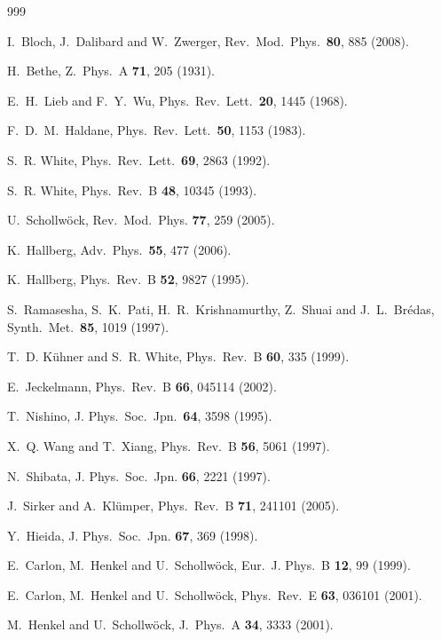 \begin{thebibliography}{999}

I.~Bloch, J.~Dalibard and W.~Zwerger, Rev.\ Mod.\ Phys.\ {\bf 80}, 885 (2008).

H.~Bethe, Z.\ Phys.\ A {\bf 71}, 205 (1931).

E.~H.~Lieb and F.~Y.~Wu, Phys.\ Rev.\ Lett.\ {\bf 20}, 1445 (1968).

F.~D.~M.~Haldane, Phys.\ Rev.\ Lett.\ {\bf 50}, 1153 (1983). 

S.~R. White, Phys.\ Rev.\ Lett.\ {\bf 69}, 2863 (1992). 

S.~R. White, Phys.\ Rev.\ B {\bf 48}, 10345 (1993). 

 U.~Schollw\"{o}ck, Rev.\ Mod.\ Phys. {\bf 77}, 259 (2005).

 K.~Hallberg, Adv.\ Phys.\ {\bf 55}, 477 (2006).

K.~Hallberg, Phys.\ Rev.\ B {\bf 52}, 9827 (1995).

S.~Ramasesha, S.~K.~Pati, H.~R.~Krishnamurthy, Z.~Shuai and J.~L.~Br{\'e}das, Synth.\ Met.\ {\bf 85}, 1019 (1997).

T.~D. K\"{u}hner and S.~R. White, Phys.\ Rev.\ B {\bf 60}, 335 (1999).

E.~Jeckelmann, Phys.\ Rev.\ B {\bf 66}, 045114 (2002).
 
T.~Nishino, J. Phys.\ Soc.\ Jpn.\ {\bf 64}, 3598 (1995).

X.~Q. Wang and T.~Xiang, Phys.\ Rev.\ B {\bf 56}, 5061 (1997).

N.~Shibata, J. Phys.\ Soc.\ Jpn. {\bf 66}, 2221 (1997).

J.~Sirker and A.~Kl\"{u}mper, Phys.\ Rev.\ B {\bf 71}, 241101 (2005).

Y.~Hieida, J. Phys.\ Soc.\ Jpn. {\bf 67}, 369 (1998).

E.~Carlon, M.~Henkel and U.~Schollw\"{o}ck, Eur.\ J. Phys.\ B {\bf 12}, 99 (1999).

E.~Carlon, M.~Henkel and U.~Schollw\"{o}ck, Phys.\ Rev.\ E {\bf 63}, 036101 (2001).

M.~Henkel and U.~Schollw\"{o}ck, J.\ Phys.\ A {\bf 34}, 3333 (2001).


\end{thebibliography}
